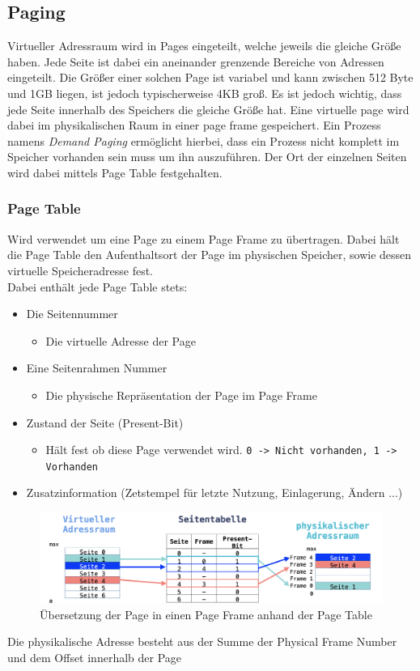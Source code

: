 \documentclass{article}
\begin{document}
	\subsection{Paging}
	Virtueller Adressraum wird in Pages eingeteilt, welche jeweils die gleiche Größe haben. Jede Seite ist dabei ein aneinander grenzende Bereiche von Adressen eingeteilt. Die Größer einer solchen Page ist variabel und kann zwischen 512 Byte und 1GB liegen, ist jedoch typischerweise 4KB groß. Es ist jedoch wichtig, dass jede Seite innerhalb des Speichers die gleiche Größe hat. Eine virtuelle page wird dabei im physikalischen Raum in einer page frame gespeichert. Ein Prozess namens \textit{Demand Paging} ermöglicht hierbei, dass ein Prozess nicht komplett im Speicher vorhanden sein muss um ihn auszuführen. Der Ort der einzelnen Seiten wird dabei mittels Page Table festgehalten.
	\subsubsection{Page Table}
	Wird verwendet um eine Page zu einem Page Frame zu übertragen. Dabei hält die Page Table den Aufenthaltsort der Page im physischen Speicher, sowie dessen virtuelle Speicheradresse fest. \\
	Dabei enthält jede Page Table stets:
	\begin{itemize}
		\item{Die Seitennummer}
		\begin{itemize}
			\item{Die virtuelle Adresse der Page}
		\end{itemize}
		\item{Eine Seitenrahmen Nummer}
		\begin{itemize}
			\item{Die physische Repräsentation der Page im Page Frame}
		\end{itemize}
		\item{Zustand der Seite (Present-Bit)}
		\begin{itemize}
			\item{Hält fest ob diese Page verwendet wird. \verb|0 -> Nicht vorhanden, 1 -> Vorhanden|}
		\end{itemize}
		\item{Zusatzinformation (Zetstempel für letzte Nutzung, Einlagerung, Ändern ...)}
	\end{itemize}
	\begin{figure}[H]
	\centering
	\includegraphics[scale=0.5]{Bilder/pagetable.png}
	\caption{Übersetzung der Page in einen Page Frame anhand der Page Table}
	\end{figure}
	Die physikalische Adresse besteht aus der Summe der Physical Frame Number und dem Offset innerhalb der Page
\end{document}
